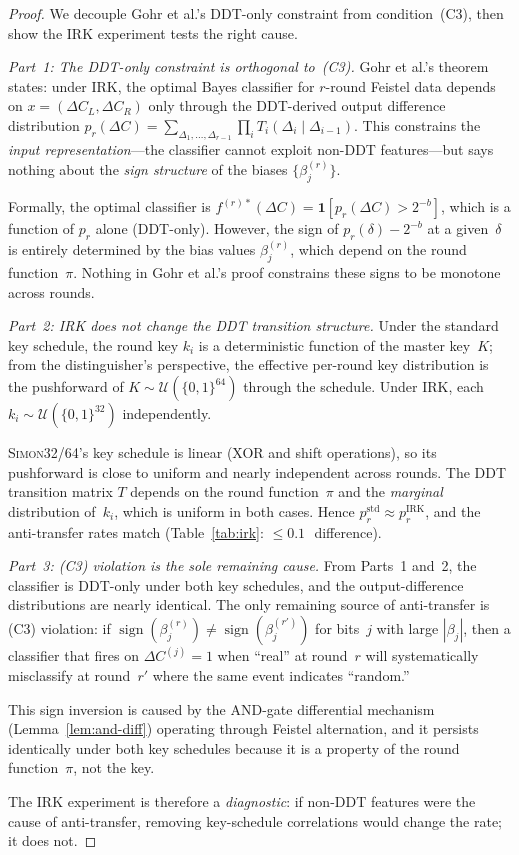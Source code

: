 \documentclass[runningheads]{llncs}
\newcommand{\simon}{\textsc{Simon32/64}\xspace}
\newcommand{\pp}{\,\text{pp}}  %
\begin{document}
\begin{proof}
We decouple Gohr et al.'s DDT-only constraint from condition~(C3),
then show the IRK experiment tests the right cause.

\medskip\noindent\textit{Part~1: The DDT-only constraint is orthogonal
to~(C3).}
Gohr et al.'s theorem states: under IRK, the optimal Bayes classifier
for $r$-round Feistel data depends on
$x = (\Delta C_L, \Delta C_R)$ only through the DDT-derived output
difference distribution
$p_r(\Delta C)
= \sum_{\Delta_1,\ldots,\Delta_{r-1}} \prod_i T_i(\Delta_i \mid
\Delta_{i-1})$.
This constrains the \emph{input representation}---the classifier cannot
exploit non-DDT features---but says nothing about the \emph{sign
structure} of the biases $\{\beta_j^{(r)}\}$.

Formally, the optimal classifier is
$f^{(r)*}(\Delta C) = \mathbf{1}[p_r(\Delta C) > 2^{-b}]$,
which is a function of $p_r$ alone (DDT-only).
However, the sign of $p_r(\delta) - 2^{-b}$ at a given~$\delta$ is
entirely determined by the bias values $\beta_j^{(r)}$, which depend
on the round function~$\pi$.
Nothing in Gohr et al.'s proof constrains these signs to be monotone
across rounds.

\medskip\noindent\textit{Part~2: IRK does not change the DDT transition
structure.}
Under the standard key schedule, the round key $k_i$ is a deterministic
function of the master key~$K$;
from the distinguisher's perspective, the effective per-round key
distribution is the pushforward of $K \sim
\mathcal{U}(\{0,1\}^{64})$ through the schedule.
Under IRK, each $k_i \sim \mathcal{U}(\{0,1\}^{32})$ independently.

\simon's key schedule is linear (XOR and shift operations), so its
pushforward is close to uniform and nearly independent across rounds.
The DDT transition matrix $T$ depends on the round function~$\pi$ and
the \emph{marginal} distribution of~$k_i$, which is uniform in both
cases.
Hence $p_r^{\mathrm{std}} \approx p_r^{\mathrm{IRK}}$, and the
anti-transfer rates match (Table~\ref{tab:irk}: $\leq 0.1$\pp\
difference).

\medskip\noindent\textit{Part~3: (C3) violation is the sole remaining
cause.}
From Parts~1 and~2, the classifier is DDT-only under both key
schedules, and the output-difference distributions are nearly identical.
The only remaining source of anti-transfer is (C3) violation: if
$\operatorname{sign}(\beta_j^{(r)}) \neq
\operatorname{sign}(\beta_j^{(r')})$
for bits~$j$ with large $|\beta_j|$, then a classifier that fires on
$\Delta C^{(j)} = 1$ when ``real'' at round~$r$ will systematically
misclassify at round~$r'$ where the same event indicates ``random.''

This sign inversion is caused by the AND-gate differential mechanism
(Lemma~\ref{lem:and-diff}) operating through Feistel alternation, and
it persists identically under both key schedules because it is a
property of the round function~$\pi$, not the key.

\medskip\noindent
The IRK experiment is therefore a \emph{diagnostic}: if non-DDT features
were the cause of anti-transfer, removing key-schedule correlations
would change the rate; it does not.
\end{proof}
\end{document}
